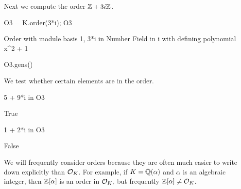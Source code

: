 \noindent Next we compute the order $\mathbb{Z} + 3i \mathbb{Z}$.
\begin{sagecode}
\begin{sagecell}
O3 = K.order(3*i); O3
\end{sagecell}
\begin{sageout}
Order with module basis 1, 3*i in Number Field in i with
defining polynomial x^2 + 1
\end{sageout}
\begin{sagecell}
O3.gens()
\end{sagecell}
\begin{sageout}
[1, 3*i]
\end{sageout}
\end{sagecode}


\noindent We test whether certain elements are in the order.
\begin{sagecode}
\begin{sagecell}
5 + 9*i in O3
\end{sagecell}
\begin{sageout}
True
\end{sageout}
\begin{sagecell}
1 + 2*i in O3
\end{sagecell}
\begin{sageout}
False
\end{sageout}
\end{sagecode}


We will frequently consider orders because they are often much easier
to write down explicitly than $\mathcal{O}_K$.  For example, if $K=\mathbb{Q}(\alpha)$
and $\alpha$ is an algebraic integer, then $\mathbb{Z}[\alpha]$ is an order in
$\mathcal{O}_K$, but frequently $\mathbb{Z}[\alpha]\neq \mathcal{O}_K$.

